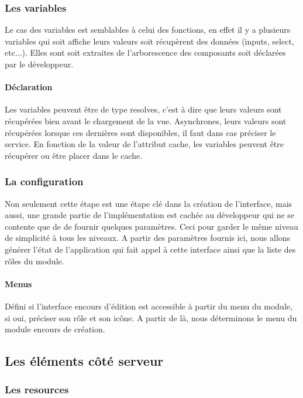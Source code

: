 \documentclass[a4paper,12pt]{article}
\begin{document}
\subsubsection{ Les variables}
Le cas des variables est semblables à celui des fonctions, en effet il y a plusieurs variables
qui soit affiche leurs valeurs soit récupèrent des données (inputs, select, etc...). Elles sont soit extraites 
de l'arborescence des composants soit déclarées par le développeur.
\paragraph{Déclaration}
Les variables  peuvent être de type  resolves, c'est à dire que
leurs valeurs sont récupérées bien avant le chargement de la
vue. Asynchrones, leurs valeurs sont récupérées lorsque ces dernières
sont disponibles, il faut dans cas préciser le service.%
En fonction de la valeur de l'attribut cache, les variables peuvent être récupérer  ou être  placer dans le cache. 

\subsubsection{ La configuration} 
Non seulement cette étape est une étape clé dans la création de l'interface,
mais aussi, une grande partie de l'implémentation
est cachée au développeur qui ne se contente que de de fournir quelques paramètres. 
Ceci pour garder le même niveau de simplicité à tous les niveaux. A partir des paramètres fournis
ici, nous allons générer l'état de l'application qui fait appel à cette interface ainsi que la liste des rôles du module.
\paragraph{Menus}
Défini si l'interface encours d'édition est accessible à partir du menu du module,
si oui, préciser son rôle et son icône. A partir de là, nous déterminons le menu 
du module encours de création. 

\subsection{Les éléments côté serveur}

\subsubsection{Les resources}
  
\end{document}
